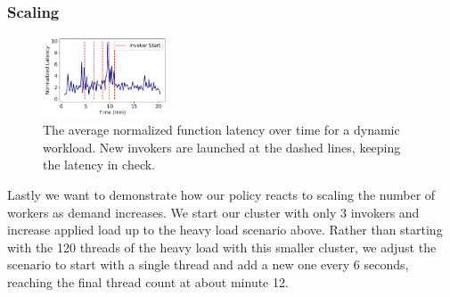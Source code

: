   \vspace*{-0.2cm}
\subsubsection{Scaling}

\begin{figure}  \includegraphics[width=0.33\textwidth]{chrlu/faaslb-osdi22/figs/scaling/scaling_lat_over_time-nolabel.pdf}
  \caption{The average normalized function latency over time for a dynamic workload. New invokers are launched at the dashed lines, keeping the latency in check.}
  \label{fig:scaling-latency}
\end{figure}



Lastly we want to demonstrate how our policy reacts to scaling the number of workers as demand increases.
We start our cluster with only 3 invokers and increase applied load up to the heavy load scenario above.
Rather than starting with the 120 threads of the heavy load with this smaller cluster, we adjust the scenario to start with a single thread and add a new one every 6 seconds, reaching the final thread count at about minute 12.

